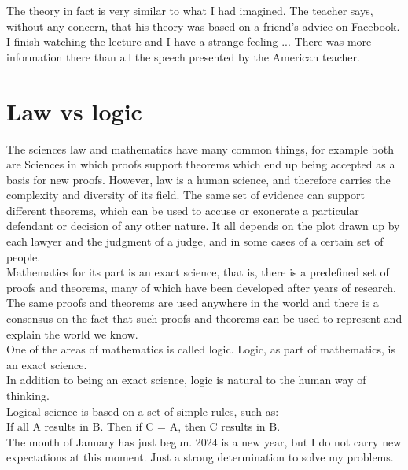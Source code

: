 \documentclass[11pt]{book}
\begin{document}
\noindent The theory in fact is very similar to what I had imagined. The teacher says, without any concern, that his theory was based on a friend's advice on Facebook. \\

\noindent I finish watching the lecture and I have a strange feeling ... There was more information there than all the speech presented by the American teacher.

\chapter{Law vs logic}

The sciences law and mathematics have many common things, for example both are Sciences in which proofs support theorems which end up being accepted as a basis for new proofs. However, law is a human science, and therefore carries the complexity and diversity of its field. The same set of evidence can support different theorems, which can be used to accuse or exonerate a particular defendant or decision of any other nature. It all depends on the plot drawn up by each lawyer and the judgment of a judge, and in some cases of a certain set of people. \\

\noindent Mathematics for its part is an exact science, that is, there is a predefined set of proofs and theorems, many of which have been developed after years of research. The same proofs and theorems are used anywhere in the world and there is a consensus on the fact that such proofs and theorems can be used to represent and explain the world we know.  \\

\noindent One of the areas of mathematics is called logic. Logic, as part of mathematics, is an exact science. 
\\

\noindent In addition to being an exact science, logic is natural to the human way of thinking. \\

\noindent Logical science is based on a set of simple rules, such as: \\

\noindent If all A results in B. Then if C = A, then C results in B. \\

\noindent The month of January has just begun. 2024 is a new year, but I do not carry new expectations at this moment. Just a strong determination to solve my problems. \\
\end{document}

